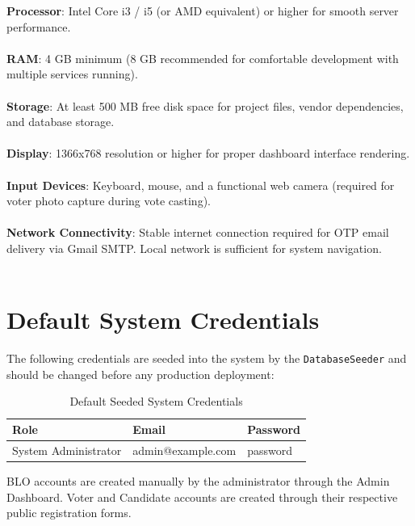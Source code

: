 \textbf{Processor}: Intel Core i3 / i5 (or AMD equivalent) or higher for smooth server performance.
\\\\
\textbf{RAM}: 4 GB minimum (8 GB recommended for comfortable development with multiple services running).
\\\\
\textbf{Storage}: At least 500 MB free disk space for project files, vendor dependencies, and database storage.
\\\\
\textbf{Display}: 1366x768 resolution or higher for proper dashboard interface rendering.
\\\\
\textbf{Input Devices}: Keyboard, mouse, and a functional web camera (required for voter photo capture during vote casting).
\\\\
\textbf{Network Connectivity}: Stable internet connection required for OTP email delivery via Gmail SMTP. Local network is sufficient for system navigation.
\\\\

\section{Default System Credentials}

The following credentials are seeded into the system by the \texttt{DatabaseSeeder} and should be changed before any production deployment:

\medskip
\begin{table}[H]
\centering
\renewcommand{\arraystretch}{1.3}
\begin{tabular}{|l|l|l|}
\hline
\textbf{Role} & \textbf{Email} & \textbf{Password} \\
\hline
System Administrator & admin@example.com & password \\
\hline
\end{tabular}
\caption{Default Seeded System Credentials}
\label{tab:credentials}
\end{table}

BLO accounts are created manually by the administrator through the Admin Dashboard. Voter and Candidate accounts are created through their respective public registration forms.
